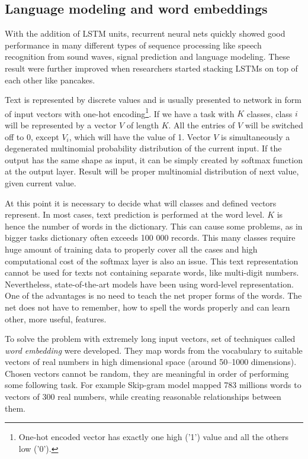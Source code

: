 		\subsection{Language modeling and word embeddings}

With the addition of LSTM units, recurrent neural nets quickly showed good performance in many different types of sequence processing like speech recognition from sound waves, signal prediction and language modeling. These result were further improved when researchers started stacking LSTMs on top of each other like pancakes.

Text is represented by discrete values and is usually presented to network in form of input vectors with one-hot encoding\footnote{One-hot encoded vector has exactly one high ('1') value and all the others low ('0').}. If we have a task with $ K $ classes, class $ i $ will be represented by a vector $ V $ of length $ K $. All the entries of $ V $ will be switched off to 0, except $ V_i $, which will have the value of 1. Vector $ V $ is simultaneously a degenerated multinomial probability distribution of the current input. If the output has the same shape as input, it can be simply created by softmax function at the output layer. Result will be proper multinomial distribution of next value, given current value.

At this point it is necessary to decide what will classes and defined vectors represent. In most cases, text prediction is performed at the word level. $ K $ is hence the number of words in the dictionary. This can cause some problems, as in bigger tasks dictionary often exceeds 100 000 records. This many classes require huge amount of training data to properly cover all the cases and high computational cost of the softmax layer is also an issue. This text representation cannot be used for texts not containing separate words, like multi-digit numbers. Nevertheless, state-of-the-art models have been using word-level representation. One of the advantages is no need to teach the net proper forms of the words. The net does not have to remember, how to spell the words properly and can learn other, more useful, features.

To solve the problem with extremely long input vectors, set of techniques called \emph{word embedding} were developed. They map words from the vocabulary to suitable vectors of real numbers in high dimensional space (around 50--1000 dimensions). Chosen vectors cannot be random, they are meaningful in order of performing some following task. For example Skip-gram model\cite{DBLP:journals/corr/abs-1301-3781} mapped 783 millions words to vectors of 300 real numbers, while creating reasonable relationships between them.

